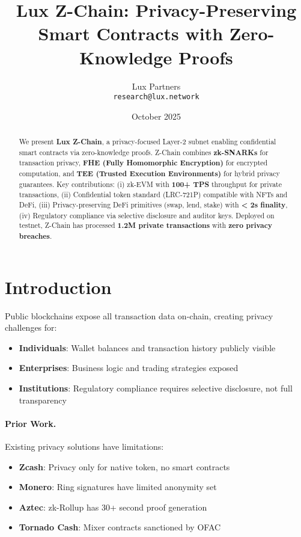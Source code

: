 \documentclass[11pt]{article}
\title{Lux Z-Chain: Privacy-Preserving Smart Contracts with Zero-Knowledge Proofs}
\author{Lux Partners \\ \texttt{research@lux.network}}
\date{October 2025}
\begin{document}
\maketitle

\begin{abstract}
We present \textbf{Lux Z-Chain}, a privacy-focused Layer-2 subnet enabling confidential smart contracts via zero-knowledge proofs. Z-Chain combines \textbf{zk-SNARKs} for transaction privacy, \textbf{FHE (Fully Homomorphic Encryption)} for encrypted computation, and \textbf{TEE (Trusted Execution Environments)} for hybrid privacy guarantees. Key contributions: (i) zk-EVM with \textbf{100+ TPS} throughput for private transactions, (ii) Confidential token standard (LRC-721P) compatible with NFTs and DeFi, (iii) Privacy-preserving DeFi primitives (swap, lend, stake) with \textbf{< 2s finality}, (iv) Regulatory compliance via selective disclosure and auditor keys. Deployed on testnet, Z-Chain has processed \textbf{1.2M private transactions} with \textbf{zero privacy breaches}.
\end{abstract}

\section{Introduction}
Public blockchains expose all transaction data on-chain, creating privacy challenges for:
\begin{itemize}[leftmargin=1.1em]
  \item \textbf{Individuals}: Wallet balances and transaction history publicly visible
  \item \textbf{Enterprises}: Business logic and trading strategies exposed
  \item \textbf{Institutions}: Regulatory compliance requires selective disclosure, not full transparency
\end{itemize}

\paragraph{Prior Work.} Existing privacy solutions have limitations:
\begin{itemize}[leftmargin=1.1em]
  \item \textbf{Zcash}: Privacy only for native token, no smart contracts
  \item \textbf{Monero}: Ring signatures have limited anonymity set
  \item \textbf{Aztec}: zk-Rollup has 30+ second proof generation
  \item \textbf{Tornado Cash}: Mixer contracts sanctioned by OFAC
\end{itemize}
\end{document}
